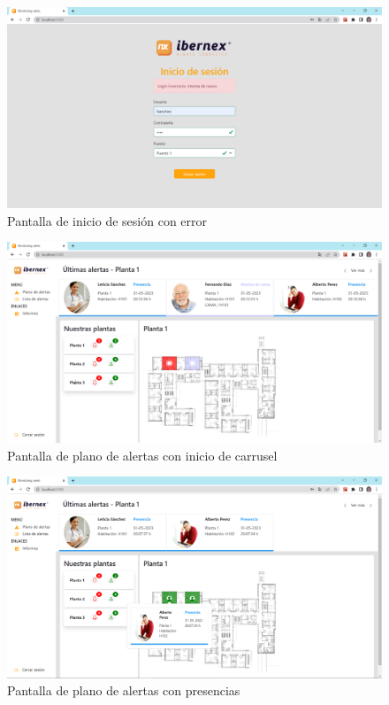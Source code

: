 \begin{landscape}
\begin{figure}[!ht]
    \centering
    \includegraphics[width=25cm]{Imagenes/login-error.PNG}
    \caption{Pantalla de inicio de sesión con error}
    \label{fig:login-error}
\end{figure}

\begin{figure}[!ht]
    \centering
    \includegraphics[width=25cm]{Imagenes/map-alarmas-estados-inicio-carrusel.PNG}
    \caption{Pantalla de plano de alertas con inicio de carrusel}
    \label{fig:map-carrusel}
\end{figure}

\begin{figure}[!ht]
    \centering
    \includegraphics[width=25cm]{Imagenes/map-presencias.PNG}
    \caption{Pantalla de plano de alertas con presencias}
    \label{fig:map-presencias}
\end{figure}


\end{landscape}
